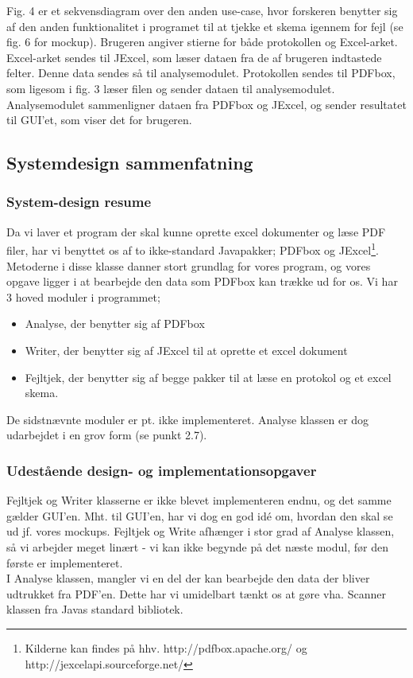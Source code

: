 \documentclass[11pt]{article}
\begin{document}
Fig. 4 er et sekvensdiagram over den anden use-case, hvor forskeren benytter sig af den anden funktionalitet i programet til at tjekke et skema igennem for fejl (se fig. 6 for mockup). Brugeren angiver stierne for både protokollen og Excel-arket. Excel-arket sendes til JExcel, som læser dataen fra de af brugeren indtastede felter. Denne data sendes så til analysemodulet. Protokollen sendes til PDFbox, som ligesom i fig. 3 læser filen og sender dataen til analysemodulet. Analysemodulet sammenligner dataen fra PDFbox og JExcel, og sender resultatet til GUI'et, som viser det for brugeren.
\subsection{Systemdesign sammenfatning}
\subsubsection{System-design resume}
Da vi laver et program der skal kunne oprette excel dokumenter og læse PDF filer, har vi benyttet os af to ikke-standard Javapakker; PDFbox og JExcel\footnote{Kilderne kan findes på hhv. http://pdfbox.apache.org/ og http://jexcelapi.sourceforge.net/}. Metoderne i disse klasse danner stort grundlag for vores program, og vores opgave ligger i at bearbejde den data som PDFbox kan trække ud for os. Vi har 3 hoved moduler i programmet; \begin{itemize}

\item Analyse, der benytter sig af PDFbox
\item Writer, der benytter sig af JExcel til at oprette et excel dokument
\item Fejltjek, der benytter sig af begge pakker til at læse en protokol og et excel skema.
\end{itemize}
De sidstnævnte moduler er pt. ikke implementeret.
Analyse klassen er dog udarbejdet i en grov form (se punkt 2.7).
\subsubsection{Udestående design- og implementationsopgaver}
Fejltjek og Writer klasserne er ikke blevet implementeren endnu, og det samme gælder GUI'en. Mht. til GUI'en, har vi dog en god idé om, hvordan den skal se ud jf. vores mockups. Fejltjek og Write afhænger i stor grad af Analyse klassen, så vi arbejder meget linært - vi kan ikke begynde på det næste modul, før den første er implementeret.\\I Analyse klassen, mangler vi en del der kan bearbejde den data der bliver udtrukket fra PDF'en. Dette har vi umidelbart tænkt os at gøre vha. Scanner klassen fra Javas standard bibliotek.
\end{document}
